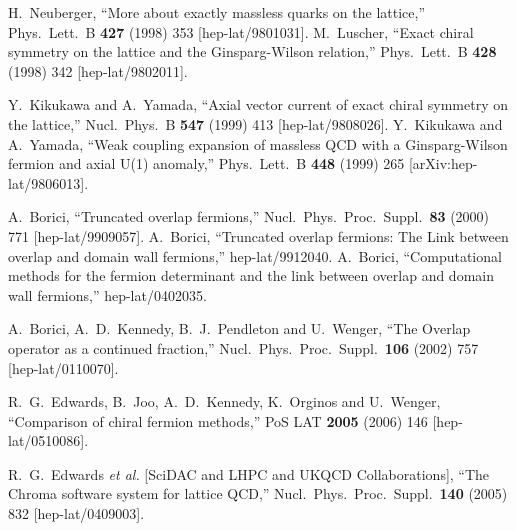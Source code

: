 \documentclass[letter,10pt]{report}
\begin{document}
\begin{thebibliography}{99}

  H.~Neuberger,
  ``More about exactly massless quarks on the lattice,''
  Phys.\ Lett.\ B {\bf 427} (1998) 353
  [hep-lat/9801031].
  M.~Luscher,
  ``Exact chiral symmetry on the lattice and the Ginsparg-Wilson relation,''
  Phys.\ Lett.\ B {\bf 428} (1998) 342
  [hep-lat/9802011].



  Y.~Kikukawa and A.~Yamada,
  ``Axial vector current of exact chiral symmetry on the lattice,''
  Nucl.\ Phys.\ B {\bf 547} (1999) 413
  [hep-lat/9808026].
  Y.~Kikukawa and A.~Yamada,
  ``Weak coupling expansion of massless QCD with a Ginsparg-Wilson fermion and axial U(1) anomaly,''
  Phys.\ Lett.\  B {\bf 448} (1999) 265
  [arXiv:hep-lat/9806013].


  A.~Borici,
  ``Truncated overlap fermions,''
  Nucl.\ Phys.\ Proc.\ Suppl.\  {\bf 83} (2000) 771
  [hep-lat/9909057].
  A.~Borici,
  ``Truncated overlap fermions: The Link between overlap and domain wall fermions,''
  hep-lat/9912040.
  A.~Borici,
  ``Computational methods for the fermion determinant and the link between overlap and domain wall fermions,''
  hep-lat/0402035.



  A.~Borici, A.~D.~Kennedy, B.~J.~Pendleton and U.~Wenger,
  ``The Overlap operator as a continued fraction,''
  Nucl.\ Phys.\ Proc.\ Suppl.\  {\bf 106} (2002) 757
  [hep-lat/0110070].

  R.~G.~Edwards, B.~Joo, A.~D.~Kennedy, K.~Orginos and U.~Wenger,
  ``Comparison of chiral fermion methods,''
  PoS LAT {\bf 2005} (2006) 146
  [hep-lat/0510086].

  R.~G.~Edwards {\it et al.}  [SciDAC and LHPC and UKQCD Collaborations],
  ``The Chroma software system for lattice QCD,''
  Nucl.\ Phys.\ Proc.\ Suppl.\  {\bf 140} (2005) 832
  [hep-lat/0409003].



\end{thebibliography}
\end{document}
